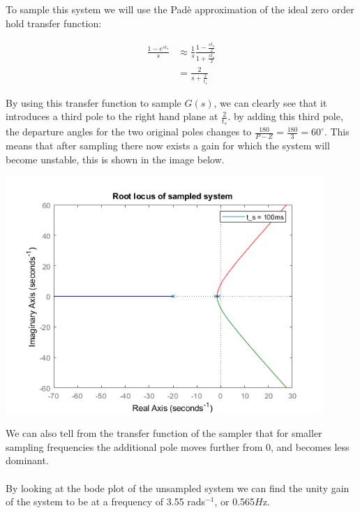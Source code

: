 \documentclass[a4paper,11pt]{article}
\begin{document}
\begin{preview}
\begin{enumerate}
To sample this system we will use the Pad\`{e} approximation of the ideal zero order hold transfer function:

\begin{align*}
  \frac{1-e^{s t_s}}{s} &\approx\frac{1}{s}\frac{1-\frac{s t_s}{2}}{1+\frac{s t_s}{2}}\\
  &= \frac{2}{s+\frac{2}{t_s}}
\end{align*}

By using this transfer function to sample $G(s)$, we can clearly see that it introduces a third pole to the right hand plane at $\frac{2}{t_s}$. by adding this third pole, the departure angles for the two original poles changes to $\frac{180}{P-Z} = \frac{180}{3} = 60^\circ$. This means that after sampling there now exists a gain for which the system will become unstable, this is shown in the image below. 

\begin{center}
  \includegraphics[width=0.9\textwidth]{Summative/rlocus_sampled_100ms.png}
\end{center}

We can also tell from the transfer function of the sampler that for smaller sampling frequencies the additional pole moves further from 0, and becomes less dominant.\\\\

By looking at the bode plot of the unsampled system we can find the unity gain of the system to be at a frequency of 3.55 rads$^{-1}$, or 0.565$H$z.


\end{enumerate}
\end{preview}
\end{document}
